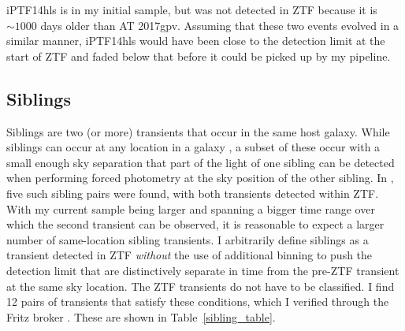 \documentclass[a4paper,oneside,12pt, class=Latex/Classes/PhDthesisPSnPDF, crop=false]{standalone}
\begin{document}
iPTF14hls is in my initial sample, but was not detected in ZTF because it is $\sim1000$ days older than AT 2017gpv. Assuming that these two events evolved in a similar manner, iPTF14hls would have been close to the detection limit at the start of ZTF and faded below that before it could be picked up by my pipeline.


\subsection{Siblings}
\label{siblings}
Siblings are two (or more) transients that occur in the same host galaxy. While siblings can occur at any location in a galaxy \citep[see e.g. ][for a sample of ZTF-detected siblings]{BTS_siblings, DR2_siblings}, a subset of these occur with a small enough sky separation that part of the light of one sibling can be detected when performing forced photometry at the sky position of the other sibling. In \citet{Terwel_2024_paper1}, five such sibling pairs were found, with both transients detected within ZTF. With my current sample being larger and spanning a bigger time range over which the second transient can be observed, it is reasonable to expect a larger number of same-location sibling transients. I arbitrarily define siblings as a transient detected in ZTF \textit{without} the use of additional binning to push the detection limit that are distinctively separate in time from the pre-ZTF transient at the same sky location. The ZTF transients do not have to be classified. I find 12 pairs of transients that satisfy these conditions, which I verified through the Fritz broker \cite{skyportal2019, Skyportal}. These are shown in Table~\ref{sibling_table}. 
\end{document}
